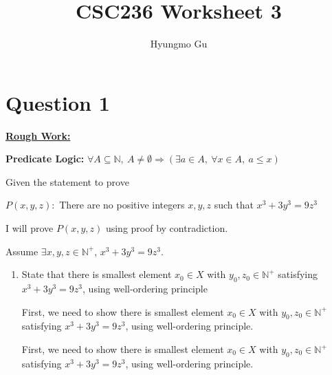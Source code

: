 \documentclass[12pt]{article}
\begin{document}
\title{CSC236 Worksheet 3}
\author{Hyungmo Gu}
\maketitle

\section*{Question 1}

\bigskip

\begin{mdframed}
    \underline{\textbf{Rough Work:}}

    \bigskip

    \textbf{Predicate Logic:} $\forall A \subseteq \mathbb{N},\:A \neq \emptyset \Rightarrow
    (\exists a \in A, \: \forall x \in A,\: a \leq x)$

    \bigskip

    Given the statement to prove

    \bigskip

    \begin{center}
        $P(x,y,z):$ There are no positive integers $x,y,z$ such that $x^3 + 3y^3 = 9z^3$
    \end{center}

    \bigskip

    I will prove $P(x,y,z)$ using proof by contradiction.

    \bigskip

    Assume $\exists x,y,z \in \mathbb{N}^{+}$, $x^3 + 3y^3 = 9z^3$.

    \begin{enumerate}[1.]

        \item State that there is smallest element $x_0 \in X$ with $y_0,z_0 \in \mathbb{N}^+$
        satisfying $x^3 + 3y^3 = 9z^3$, using well-ordering principle

        \bigskip

        First, we need to show there is smallest element $x_0 \in X$ with $y_0,z_0 \in \mathbb{N}^+$
        satisfying $x^3 + 3y^3 = 9z^3$, using well-ordering principle.

        \bigskip

        \begin{mdframed}
        First, we need to show there is smallest element $x_0 \in X$ with $y_0,z_0 \in \mathbb{N}^+$
        satisfying $x^3 + 3y^3 = 9z^3$, using well-ordering principle.


\end{mdframed}
\end{enumerate}
\end{mdframed}
\end{document}

